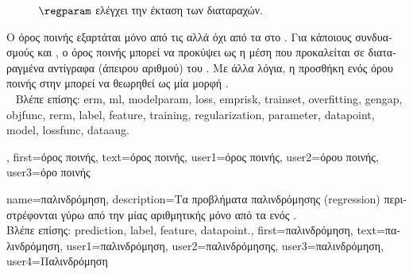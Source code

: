 {{\begin{figure}[H]
\begin{center}
{{			  $\regparam$ \foreignlanguage{greek}{ελέγχει την έκταση των διαταραχών}. 
			\label{fig_penal_term_dict} } }
			\end{center}
		\end{figure} 
  		\foreignlanguage{greek}{Ο όρος ποινής εξαρτάται μόνο από τις}  \foreignlanguage{greek}{αλλά όχι από τα}  
		 \foreignlanguage{greek}{στο} . \foreignlanguage{greek}{Για κάποιους συνδυασμούς}  
		 \foreignlanguage{greek}{και} , \foreignlanguage{greek}{ο όρος ποινής μπορεί να προκύψει ως η 
		μέση}  \foreignlanguage{greek}{που προκαλείται σε διαταραγμένα αντίγραφα (άπειρου αριθμού) του} . 
		\foreignlanguage{greek}{Με άλλα λόγια, η προσθήκη ενός όρου ποινής στην}  \foreignlanguage{greek}{μπορεί να θεωρηθεί ως 
		μία μορφή} . 
		\\ 
  		\foreignlanguage{greek}{Βλέπε επίσης:} \gls{erm}, \gls{ml}, \gls{modelparam}, \gls{loss}, \gls{emprisk}, \gls{trainset}, \gls{overfitting}, \gls{gengap},
		\gls{objfunc}, \gls{rerm}, \gls{label}, \gls{feature}, \gls{training}, \gls{regularization}, \gls{parameter}, \gls{datapoint}, \gls{model}, \gls{lossfunc}, 
		\gls{dataaug}. },
	first={\foreignlanguage{greek}{όρος ποινής}},
  	text={\foreignlanguage{greek}{όρος ποινής}},
	user1={\foreignlanguage{greek}{όρος ποινής}}, %
	user2={\foreignlanguage{greek}{όρου ποινής}}, %
	user3={\foreignlanguage{greek}{όρο ποινής}} %
}

{name={\foreignlanguage{greek}{παλινδρόμηση}},
	description={\foreignlanguage{greek}{Τα προβλήματα παλινδρόμησης} 
		(regression) \foreignlanguage{greek}{περιστρέφονται γύρω από την}  
		 \foreignlanguage{greek}{μίας αριθμητικής}  \foreignlanguage{greek}{μόνο από τα} 
		 \foreignlanguage{greek}{ενός}  \cite[\foreignlanguage{greek}{Κεφ.} 2]{MLBasics}.
		\\
		\foreignlanguage{greek}{Βλέπε επίσης:} \gls{prediction}, \gls{label}, \gls{feature}, \gls{datapoint}.},
	first={\foreignlanguage{greek}{παλινδρόμηση}},
	text={\foreignlanguage{greek}{παλινδρόμηση}},
	user1={\foreignlanguage{greek}{παλινδρόμηση}}, %
  	user2={\foreignlanguage{greek}{παλινδρόμησης}}, %
	user3={\foreignlanguage{greek}{παλινδρόμηση}}, %
	user4={\foreignlanguage{greek}{Παλινδρόμηση}} %
}

